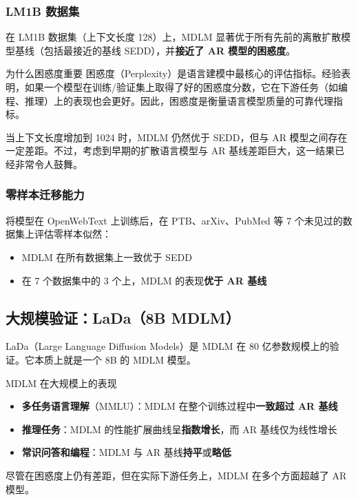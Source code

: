 \documentclass[a4paper]{article}
\begin{document}
\subsubsection{LM1B 数据集}

在 LM1B 数据集（上下文长度 128）上，MDLM 显著优于所有先前的离散扩散模型基线（包括最接近的基线 SEDD），并\textbf{接近了 AR 模型的困惑度}。

\begin{knowledgebox}{为什么困惑度重要}
困惑度（Perplexity）是语言建模中最核心的评估指标。经验表明，如果一个模型在训练/验证集上取得了好的困惑度分数，它在下游任务（如编程、推理）上的表现也会更好。因此，困惑度是衡量语言模型质量的可靠代理指标。
\end{knowledgebox}

当上下文长度增加到 1024 时，MDLM 仍然优于 SEDD，但与 AR 模型之间存在一定差距。不过，考虑到早期的扩散语言模型与 AR 基线差距巨大，这一结果已经非常令人鼓舞。

\subsubsection{零样本迁移能力}

将模型在 OpenWebText 上训练后，在 PTB、arXiv、PubMed 等 7 个未见过的数据集上评估零样本似然：
\begin{itemize}
    \item MDLM 在所有数据集上一致优于 SEDD
    \item 在 7 个数据集中的 3 个上，MDLM 的表现\textbf{优于 AR 基线}
\end{itemize}

\subsection{大规模验证：LaDa（8B MDLM）}

LaDa（Large Language Diffusion Models）是 MDLM 在 80 亿参数规模上的验证。它本质上就是一个 8B 的 MDLM 模型。

\begin{importantbox}{MDLM 在大规模上的表现}
\begin{itemize}
    \item \textbf{多任务语言理解}（MMLU）：MDLM 在整个训练过程中\textbf{一致超过 AR 基线}
    \item \textbf{推理任务}：MDLM 的性能扩展曲线呈\textbf{指数增长}，而 AR 基线仅为线性增长
    \item \textbf{常识问答和编程}：MDLM 与 AR 基线\textbf{持平}或\textbf{略低}
\end{itemize}
尽管在困惑度上仍有差距，但在实际下游任务上，MDLM 在多个方面超越了 AR 模型。
\end{importantbox}
\end{document}
